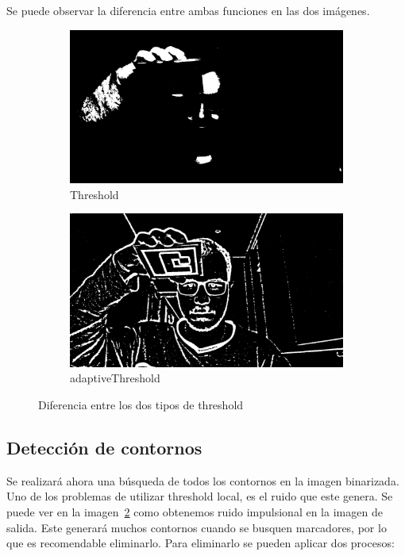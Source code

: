 \documentclass{article}
\begin{document}
Se puede observar la diferencia entre ambas funciones en las dos imágenes.
\begin{figure}[H]
  \centering
  \begin{subfigure}[c]{0.45\textwidth}
    \centering\includegraphics[width=\textwidth]{threshold.png}
    \caption{Threshold}
    \label{fig:normalthresh}
  \end{subfigure}
  \hfill
  \begin{subfigure}[c]{0.45\textwidth}
    \centering\includegraphics[width=\textwidth]{adaptive_threshold.png}
    \caption{adaptiveThreshold}
    \label{fig:adaptivethresh}
  \end{subfigure}
  \caption{Diferencia entre los dos tipos de threshold}
  \label{fig:diffthresh}
\end{figure}

\subsection{Detección de contornos}
Se realizará ahora una búsqueda de todos los contornos en la imagen binarizada. Uno de los problemas de utilizar threshold local, es el ruido que este genera. Se puede ver en la imagen~\ref{fig:adaptivethresh} como obtenemos ruido impulsional en la imagen de salida. Este generará muchos contornos cuando se busquen marcadores, por lo que es recomendable eliminarlo. Para eliminarlo se pueden aplicar dos procesos:
\end{document}
